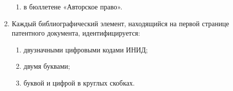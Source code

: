\begin{enumerate}
\begin{enumerate}
        \item в бюллетене «Авторское право».
    \end{enumerate}
    \item Каждый библиографический элемент, находящийся на первой странице патентного документа, идентифицируется:
    \begin{enumerate}
        \item \cmark двузначными цифровыми кодами ИНИД;
        \item двумя буквами;
        \item буквой и цифрой в круглых скобках.
    \end{enumerate}
\end{enumerate}


